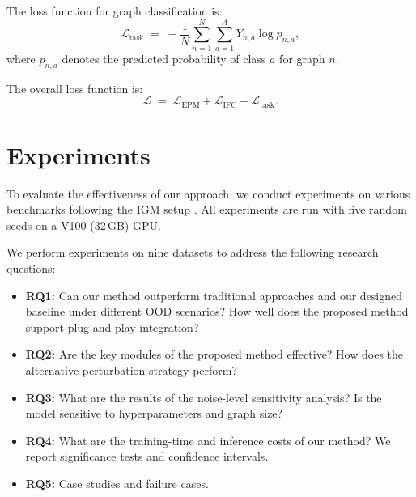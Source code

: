 \documentclass[a4paper,fleqn]{cas-dc}
\begin{document}
The loss function for graph classification is:
\[
\mathcal{L}_{\mathrm{task}} \;=\; -\frac{1}{N} \sum_{n=1}^N \sum_{a=1}^A Y_{n,a} \log p_{n,a}, \tag{8}
\]
where \(p_{n,a}\) denotes the predicted probability of class \(a\) for graph \(n\).

The overall loss function is:
\[
\mathcal{L} \;=\; \mathcal{L}_{\mathrm{EPM}} + \mathcal{L}_{\mathrm{IFC}} + \mathcal{L}_{\mathrm{task}}. \tag{9}
\]
\label{gtl}


\section{Experiments}
To evaluate the effectiveness of our approach, we conduct experiments on various benchmarks following the IGM setup \cite{jia2024graph}. All experiments are run with five random seeds on a V100 (32\,GB) GPU.

We perform experiments on nine datasets to address the following research questions:
\begin{itemize}
\item \textbf{RQ1:} Can our method outperform traditional approaches and our designed baseline under different OOD scenarios? How well does the proposed method support plug-and-play integration?
\item \textbf{RQ2:}{\color{blue} Are the key modules of the proposed method effective? How does the alternative perturbation strategy perform? } 
\item \textbf{RQ3:}{\color{blue} What are the results of the noise-level sensitivity analysis? Is the model sensitive to hyperparameters and graph size?}
\item \textbf{RQ4:}{\color{blue} What are the training-time and inference costs of our method? We report significance tests and confidence intervals.}
\item \textbf{RQ5:}{\color{blue} Case studies and failure cases.}
\end{itemize}
\end{document}
